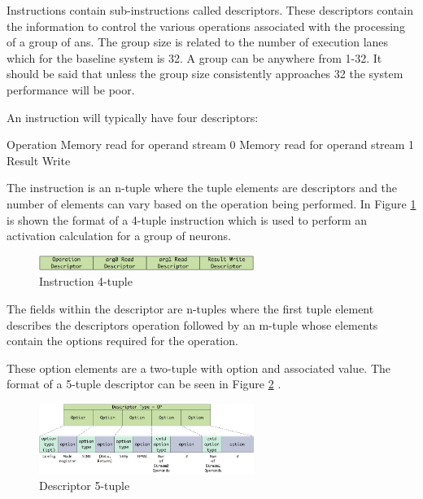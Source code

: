 \documentclass[journal]{IEEEtran}
\begin{document}
Instructions contain sub-instructions called descriptors. 
These descriptors contain the information to control the various operations associated with the processing of a group of \acp{an}.
The group size is related to the number of execution lanes which for the baseline system is 32. A group can be anywhere from 1-32. It should be said that unless the group size consistently approaches 32 the system performance will be poor.

An instruction will typically have four descriptors:

\begin{outline}
\renewcommand{\outlinei}{enumerate}
    \1 Operation
    \1 Memory read for operand stream 0
    \1 Memory read for operand stream 1
    \1 Result Write
\end{outline}

The instruction is an n-tuple where the tuple elements are descriptors and the number of elements can vary based on the operation being performed. In Figure \ref{fig:instructionTuple} is shown the format of a 4-tuple instruction which is used to perform an activation calculation for a group of neurons.

\begin{figure}[!t]
\centerline{
\mbox{\includegraphics[width=2.75in]{instruction4Tuple.jpg}}
}
\caption{Instruction 4-tuple}
\label{fig:instructionTuple}
\end{figure}

The fields within the descriptor are n-tuples where the first tuple element describes the descriptors operation followed by an m-tuple whose elements contain the options required for the operation.

These option elements are a two-tuple with option and associated value.
The format of a 5-tuple descriptor can be seen in Figure \ref{fig:descriptorTuple} .

\begin{figure}[!t]
\centerline{
\mbox{\includegraphics[width=2.75in]{descriptorTuple.jpg}}
}
\caption{Descriptor 5-tuple}
\label{fig:descriptorTuple}
\end{figure}
\end{document}
